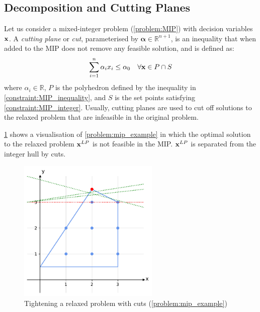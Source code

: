 \subsection{Decomposition and Cutting Planes} \label{section:cuts}
Let us consider a mixed-integer problem (\cref{problem:MIP}) with decision variables $\bold x$. A \textit{cutting plane} or \textit{cut}, parameterised by $\boldsymbol \alpha \in \mathbb{R}^{n+1}$, is an inequality that when added to the MIP does not remove any feasible solution, and is defined as: 
\begin{equation} \label{Eq:cuts}
    \sum_{i=1}^n \alpha_i x_i \leq \alpha_0 \quad  \forall \bold x \in P \cap S
\end{equation} 
\quad where $\alpha_i \in \mathbb{R}$, $P$ is the polyhedron defined by the inequality in \cref{constraint:MIP_inequality}, and $S$ is the set points satisfying \cref{constraint:MIP_integer}. Usually, cutting planes are used to cut off solutions to the relaxed problem that are infeasible in the original problem. 

\cref{fig:cuts} shows a visualisation of \cref{problem:mip_example} in which the optimal solution to the relaxed problem $\bold x^{LP}$ is not feasible in the MIP. $\bold x^{LP}$ is separated from the integer hull by cuts.

\begin{figure}[!h]
    \centering
    \includegraphics[width=0.6\textwidth]{Images/mip_cut.pdf}
    \caption{Tightening a relaxed problem with cuts (\cref{problem:mip_example})}
    \label{fig:cuts}
\end{figure}

